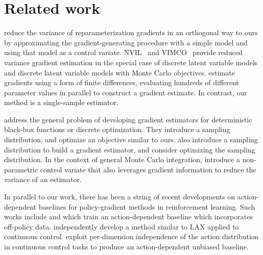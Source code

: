 \documentclass{article}
\begin{document}
\section{Related work}
\citet{miller2017reducing} reduce the variance of reparameterization gradients in an orthogonal way to ours by approximating the gradient-generating procedure with a simple model and using that model as a control variate.
NVIL~\citep{mnih2014neural} and VIMCO~\citep{mnih2016variational} provide reduced variance gradient estimation in the special case of discrete latent variable models and discrete latent variable models with Monte Carlo objectives.
\citet{salimans2017evolution} estimate gradients using a form of finite differences, evaluating hundreds of different parameter values in parallel to construct a gradient estimate.
In contrast, our method is a single-sample estimator.



\citet{staines2012variational} address the general problem of developing gradient estimators for deterministic black-box functions or discrete optimization.
They introduce a sampling distribution, and optimize an objective similar to ours.
\citet{wierstra2014natural} also introduce a sampling distribution to build a gradient estimator, and consider optimizing the sampling distribution.
In the context of general Monte Carlo integration, \citet{oates2017control} introduce a non-parametric control variate that also leverages gradient information to reduce the variance of an estimator.

In parallel to our work, there has been a string of recent developments on action-dependent baselines for policy-gradient methods in reinforcement learning.  Such works include \citet{gu2016q} and \citet{gu2017interpolated} which train an action-dependent baseline which incorporates off-policy data. \cite{liu2017sample} independently develop a method similar to LAX applied to continuous control. \citet{Wu2018Factorized} exploit per-dimension independence of the action distribution in continuous control tasks to produce an action-dependent unbiased baseline. 

\end{document}
